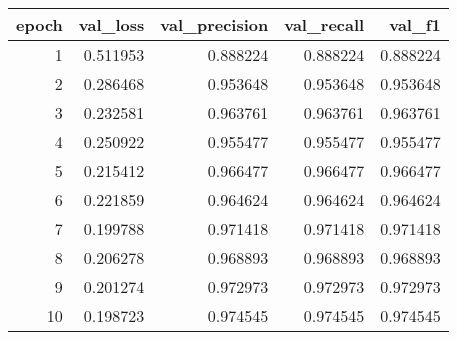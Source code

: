 \begin{tabular}{rrrrr}
\toprule
epoch & val_loss & val_precision & val_recall & val_f1 \\
\midrule
1 & 0.511953 & 0.888224 & 0.888224 & 0.888224 \\
2 & 0.286468 & 0.953648 & 0.953648 & 0.953648 \\
3 & 0.232581 & 0.963761 & 0.963761 & 0.963761 \\
4 & 0.250922 & 0.955477 & 0.955477 & 0.955477 \\
5 & 0.215412 & 0.966477 & 0.966477 & 0.966477 \\
6 & 0.221859 & 0.964624 & 0.964624 & 0.964624 \\
7 & 0.199788 & 0.971418 & 0.971418 & 0.971418 \\
8 & 0.206278 & 0.968893 & 0.968893 & 0.968893 \\
9 & 0.201274 & 0.972973 & 0.972973 & 0.972973 \\
10 & 0.198723 & 0.974545 & 0.974545 & 0.974545 \\
\bottomrule
\end{tabular}
